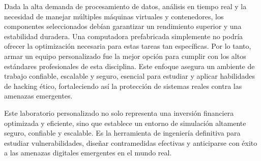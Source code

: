 \documentclass[12pt, a4paper]{article}
\begin{document}
Dada la alta demanda de procesamiento de datos, análisis en tiempo real y la necesidad de manejar múltiples máquinas virtuales y contenedores, los componentes seleccionados debían garantizar un rendimiento superior y una estabilidad duradera. Una computadora prefabricada simplemente no podría ofrecer la optimización necesaria para estas tareas tan específicas. Por lo tanto, armar un equipo personalizado fue la mejor opción para cumplir con los altos estándares profesionales de esta disciplina. Este enfoque asegura un ambiente de trabajo confiable, escalable y seguro, esencial para estudiar y aplicar habilidades de hacking ético, fortaleciendo así la protección de sistemas reales contra las amenazas emergentes.

Este laboratorio personalizado no solo representa una inversión financiera optimizada y eficiente, sino que establece un entorno de simulación altamente seguro, confiable y escalable. Es la herramienta de ingeniería definitiva para estudiar vulnerabilidades, diseñar contramedidas efectivas y anticiparse con éxito a las amenazas digitales emergentes en el mundo real.
\end{document}
